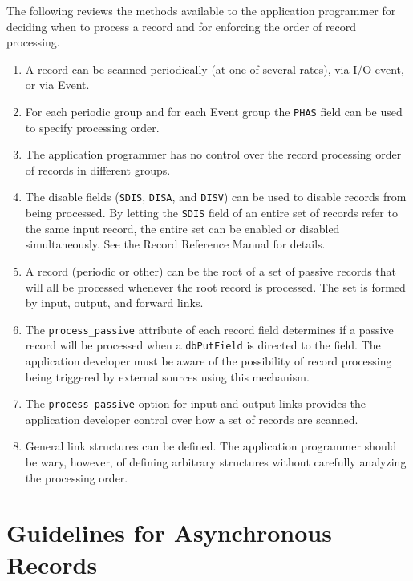 The following reviews the methods available to the application programmer for deciding when to process a record and for 
enforcing the order of record processing.

\begin{enumerate}
\item A record can be scanned periodically (at one of several rates), via I/O event, or via Event.

\item For each periodic group and for each Event group the \verb|PHAS| field can be used to specify processing order.

\item The application programmer has no control over the record processing order of records in different groups.

\item The disable fields (\verb|SDIS|, \verb|DISA|, and \verb|DISV|) can be used to disable records from being processed.
By letting the \verb|SDIS| field of an entire set of records refer to the same input record, the entire set can be enabled or disabled simultaneously.
See the Record Reference Manual for details.

\item A record (periodic or other) can be the root of a set of passive records that will all be processed whenever the root record is processed.
The set is formed by input, output, and forward links.

\item The \verb|process_passive| attribute of each record field determines if a passive record will be processed when a \verb|dbPutField| is directed to the field.
The application developer must be aware of the possibility of record processing being triggered by external sources using this mechanism.

\item The \verb|process_passive| option for input and output links provides the application developer control over how a set of records are scanned.

\item General link structures can be defined.
The application programmer should be wary, however, of defining arbitrary structures without carefully analyzing the processing order. 
\end{enumerate}

\section{Guidelines for Asynchronous Records}

